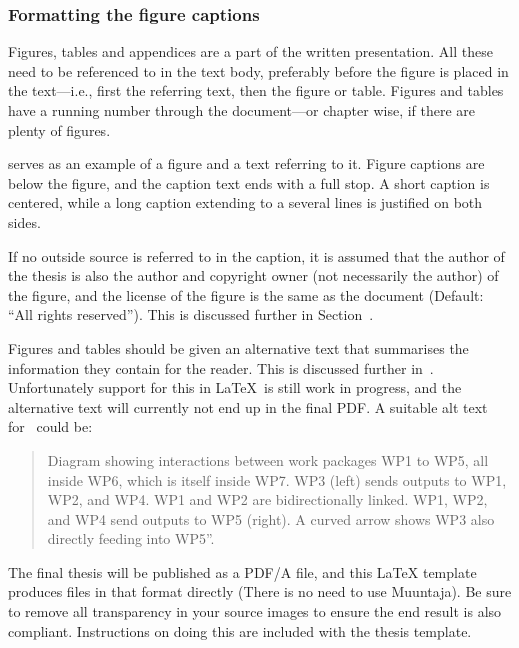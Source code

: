 \subsubsection{Formatting the figure captions}
Figures, tables and appendices are a part of the written
presentation. All these need to be referenced to in the text body,
preferably before the figure is placed in the text---i.e., first the
referring text, then the figure or table. Figures and tables have a
running number through the document---or chapter wise, if there are
plenty of figures.

 serves as an example of a figure and a text
referring to it. Figure captions are below the figure, and the caption
text ends with a full stop. A short caption is centered, while a long
caption extending to a several lines is justified on both sides. 

If no outside source is referred to in the caption, it is assumed that
the author of the thesis is also the author and copyright owner (not necessarily the author) of the figure, and the license of the figure is the same as the document (Default: ``All rights reserved''). This is discussed further in Section~.

Figures and tables should be given an alternative text that summarises
the information they contain for the reader. This is discussed further
in~. Unfortunately support for this in
\LaTeX\ is still work in progress, and the alternative text will
currently not end up in the final PDF. A suitable alt text
for~ could be:

\begin{quote}
  Diagram showing interactions between work packages WP1 to WP5, all inside WP6, which is itself inside WP7. WP3 (left) sends outputs to WP1, WP2, and WP4. WP1 and WP2 are bidirectionally linked. WP1, WP2, and WP4 send outputs to WP5 (right). A curved arrow shows WP3 also directly feeding into WP5''.
\end{quote} 

The final thesis will be published as a PDF/A file, and this LaTeX
template produces files in that format directly (There is no need to
use Muuntaja). Be sure to remove all transparency in your source
images to ensure the end result is also compliant. Instructions on doing this are included with the thesis template.


